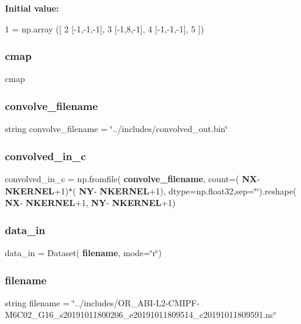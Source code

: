 {\bfseries Initial value\+:}
\begin{DoxyCode}
1 =  np.array ([
2     [-1,-1,-1],
3     [-1,8,-1],
4     [-1,-1,-1],
5     ])
\end{DoxyCode}
\mbox{\label{namespacemain_a4c8205fdd592e54d9c16836d2ff77988}} 
\subsubsection{cmap}
{\footnotesize\ttfamily cmap}

\mbox{\label{namespacemain_a1cd3d2ecfb0e2170ec3d5f0ae393a29b}} 
\subsubsection{convolve\+\_\+filename}
{\footnotesize\ttfamily string convolve\+\_\+filename = \char`\"{}../includes/convolved\+\_\+out.\+bin\char`\"{}}

\mbox{\label{namespacemain_ab3d0a6718d75deb15300ebcf87fcc137}} 
\subsubsection{convolved\+\_\+in\+\_\+c}
{\footnotesize\ttfamily convolved\+\_\+in\+\_\+c = np.\+fromfile(\textbf{ convolve\+\_\+filename}, count=(\textbf{ NX}-\/\textbf{ N\+K\+E\+R\+N\+EL}+1)$\ast$(\textbf{ NY}-\/\textbf{ N\+K\+E\+R\+N\+EL}+1), dtype=np.\+float32,sep=\char`\"{}\char`\"{}).reshape(\textbf{ NX}-\/\textbf{ N\+K\+E\+R\+N\+EL}+1,\textbf{ NY}-\/\textbf{ N\+K\+E\+R\+N\+EL}+1)}

\mbox{\label{namespacemain_a4c82e11912544a563701839da5cd255f}} 
\subsubsection{data\+\_\+in}
{\footnotesize\ttfamily data\+\_\+in = Dataset(\textbf{ filename}, mode=\char`\"{}r\char`\"{})}

\mbox{\label{namespacemain_a3a1a90139c2c8ab1fca0ea8b1790b7b2}} 
\subsubsection{filename}
{\footnotesize\ttfamily string filename = \char`\"{}../includes/O\+R\+\_\+\+A\+BI-\/L2-\/C\+M\+I\+PF-\/M6\+C02\+\_\+\+G16\+\_\+s20191011800206\+\_\+e20191011809514\+\_\+c20191011809591.\+nc\char`\"{}}

